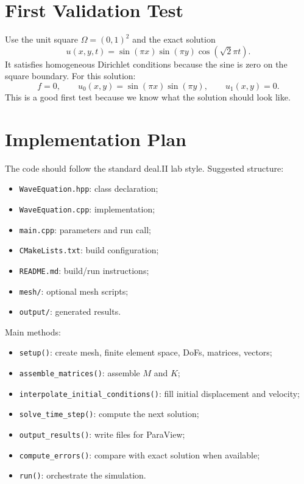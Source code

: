\documentclass[11pt,a4paper]{article}
\begin{document}
\section{First Validation Test}
Use the unit square \(\Omega=(0,1)^2\) and the exact solution
\[
u(x,y,t) = \sin(\pi x)\sin(\pi y)\cos(\sqrt{2}\pi t).
\]
It satisfies homogeneous Dirichlet conditions because the sine is zero on the square boundary.
For this solution:
\[
f=0,
\qquad
u_0(x,y)=\sin(\pi x)\sin(\pi y),
\qquad
u_1(x,y)=0.
\]
This is a good first test because we know what the solution should look like.

\section{Implementation Plan}
The code should follow the standard deal.II lab style.
Suggested structure:
\begin{itemize}
\item \texttt{WaveEquation.hpp}: class declaration;
\item \texttt{WaveEquation.cpp}: implementation;
\item \texttt{main.cpp}: parameters and run call;
\item \texttt{CMakeLists.txt}: build configuration;
\item \texttt{README.md}: build/run instructions;
\item \texttt{mesh/}: optional mesh scripts;
\item \texttt{output/}: generated results.
\end{itemize}

Main methods:
\begin{itemize}
\item \texttt{setup()}: create mesh, finite element space, DoFs, matrices, vectors;
\item \texttt{assemble\_matrices()}: assemble \(M\) and \(K\);
\item \texttt{interpolate\_initial\_conditions()}: fill initial displacement and velocity;
\item \texttt{solve\_time\_step()}: compute the next solution;
\item \texttt{output\_results()}: write files for ParaView;
\item \texttt{compute\_errors()}: compare with exact solution when available;
\item \texttt{run()}: orchestrate the simulation.
\end{itemize}
\end{document}
